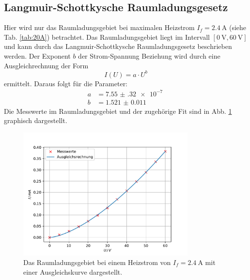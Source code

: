 \subsection{Langmuir-Schottkysche Raumladungsgesetz}
Hier wird nur das Raumladungsgebiet bei maximalen Heizstrom $I_f = \SI{2.4}{\ampere}$ (siehe Tab. \ref{tab:20A}) betrachtet.
Das Raumladungsgebiet liegt im Intervall $\left [ \SI{0}{\volt}, \SI{60}{\volt} \right ]$ und kann durch das Langmuir-Schottkysche Raumladungsgesetz beschrieben werden. %
Der Exponent $b$ der Strom-Spannung Beziehung wird durch eine Ausgleichrechnung \cite{scipy} der Form
\begin{equation*}
    I(U) = a \cdot U^b
\end{equation*}
ermittelt.
Daraus folgt für die Parameter:
\begin{align*}
    a &= \SI{7.55(32)e-7}{} \\
    b &= \SI{1.521(11)}{}
\end{align*}
Die Messwerte im Raumladungsgebiet und der zugehörige Fit sind in Abb. \ref{fig:langmuir} graphisch dargestellt.
\begin{figure}
    \centering
    \includegraphics[width=0.8\textwidth]{content/data/langmuir.pdf}
    \caption{Das Raumladungsgebiet bei einem Heizstrom von $I_f = \SI{2.4}{\ampere}$ mit einer Ausgleichskurve dargestellt. \cite{scipy}\cite{numpy}\cite{matplotlib}}
    \label{fig:langmuir}
\end{figure}
\FloatBarrier

